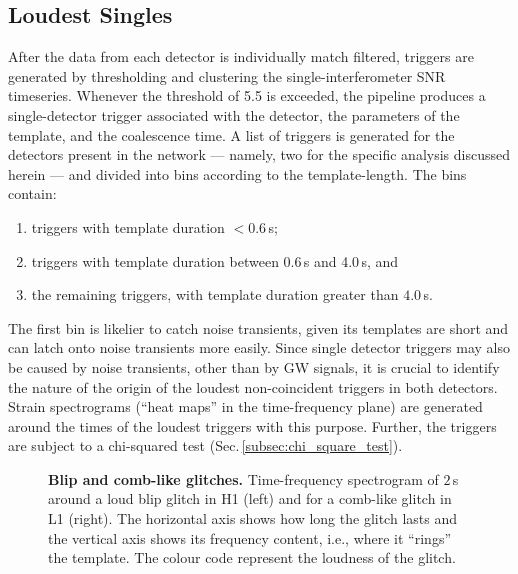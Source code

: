 \documentclass[binding=0.6cm, LaM]{sapthesis}
\begin{document}
\subsection{Loudest Singles}
	After the data from each detector is individually match filtered,
	triggers are generated by thresholding and clustering the
        single-interferometer SNR timeseries.
        Whenever the threshold of 5.5 is exceeded,
        the pipeline produces a single-detector trigger associated with the detector,
        the parameters of the template, and the coalescence time.
	A list of triggers is generated for the detectors present in the network --- namely, two for the specific analysis discussed herein --- and divided into bins according to the template-length.  The bins contain:
	\begin{enumerate}
        \item triggers with template duration $<0.6\,$s; 
        \item triggers with template duration between 0.6\,s and 4.0\,s, and
        \item the remaining triggers, with template duration greater
          than $4.0\,$s.
        \end{enumerate}
        The first bin is likelier to catch noise transients, given its templates are short and can latch onto noise transients more easily.
	Since single detector triggers may also be caused by noise transients,
	other than by GW signals, 
	it is crucial to identify the nature of the origin of the loudest non-coincident triggers in both detectors.
        Strain spectrograms (``heat maps'' in the time-frequency plane) are generated around the times of the loudest triggers with this purpose.
        Further, the triggers are subject to a chi-squared test (Sec.\,\ref{subsec:chi_square_test}).

        \begin{figure}[t]
          \noindent
          \label{glitch}
          \centering
          \caption{{\bf Blip and comb-like glitches.} Time-frequency spectrogram of $2\,$s around a loud blip glitch in H1 (left) and for a comb-like glitch in L1 (right).  The horizontal axis shows how long the glitch lasts and the vertical axis shows its frequency content, i.e., where it ``rings'' the template.  The colour code represent the loudness of the glitch.}
          \label{fig:glitches}
        \end{figure}
\end{document}
